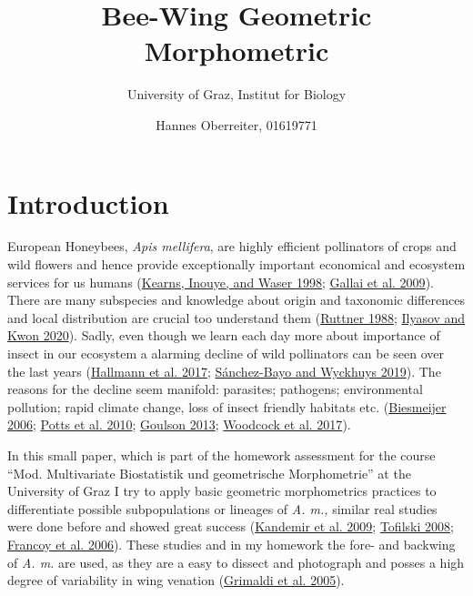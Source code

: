 \documentclass[
]{article}
\title{Bee-Wing Geometric Morphometric}
\subtitle{University of Graz, Institut for Biology}
\author{Hannes Oberreiter, 01619771}
\date{}
\begin{document}
\maketitle

\hypertarget{introduction}{%
\section{Introduction}\label{introduction}}

European Honeybees, \emph{Apis mellifera}, are highly efficient pollinators of crops and wild flowers and hence provide exceptionally important economical and ecosystem services for us humans (\protect\hyperlink{ref-kearns1998}{Kearns, Inouye, and Waser 1998}; \protect\hyperlink{ref-gallai2009}{Gallai et al. 2009}). There are many subspecies and knowledge about origin and taxonomic differences and local distribution are crucial too understand them (\protect\hyperlink{ref-ruttner1988}{Ruttner 1988}; \protect\hyperlink{ref-phylogen2020}{Ilyasov and Kwon 2020}). Sadly, even though we learn each day more about importance of insect in our ecosystem a alarming decline of wild pollinators can be seen over the last years (\protect\hyperlink{ref-hallmann2017}{Hallmann et al. 2017}; \protect\hyperlink{ref-suxe1nchez-bayo2019}{Sánchez-Bayo and Wyckhuys 2019}). The reasons for the decline seem manifold: parasites; pathogens; environmental pollution; rapid climate change, loss of insect friendly habitats etc. (\protect\hyperlink{ref-biesmeijer2006}{Biesmeijer 2006}; \protect\hyperlink{ref-potts2010}{Potts et al. 2010}; \protect\hyperlink{ref-goulson2013}{Goulson 2013}; \protect\hyperlink{ref-woodcock2017}{Woodcock et al. 2017}).

In this small paper, which is part of the homework assessment for the course ``Mod. Multivariate Biostatistik und geometrische Morphometrie'' at the University of Graz I try to apply basic geometric morphometrics practices to differentiate possible subpopulations or lineages of \emph{A. m.,} similar real studies were done before and showed great success (\protect\hyperlink{ref-kandemir2009}{Kandemir et al. 2009}; \protect\hyperlink{ref-tofilski2008}{Tofilski 2008}; \protect\hyperlink{ref-francoy2006}{Francoy et al. 2006}). These studies and in my homework the fore- and backwing of \emph{A. m.} are used, as they are a easy to dissect and photograph and posses a high degree of variability in wing venation (\protect\hyperlink{ref-grimaldi2005}{Grimaldi et al. 2005}).
\end{document}
